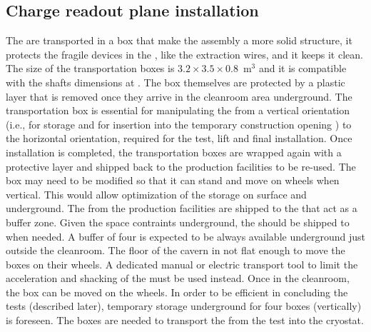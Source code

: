 \subsection{Charge readout plane installation}
The  are transported in a box that make the  assembly a more solid structure, it protects the fragile devices in the , like the extraction wires, and it keeps it clean.
The size of the transportation boxes is $3.2\times3.5\times0.8$~m$^3$ and it is compatible with the shafts dimensions at .
The box themselves are protected by a plastic layer that is removed once they arrive in the cleanroom area underground.
The transportation box is essential for manipulating the  from a vertical orientation (i.e., for storage and for insertion into the temporary construction opening ) to the horizontal orientation, required for the  \coldbox test, lift and final installation.
Once installation is completed, the transportation boxes are wrapped again with a protective layer and shipped back to the production facilities to be re-used.
The  box may need to be modified so that it can stand and move on wheels when vertical.
This would allow optimization of the storage on surface and underground.
The  from the production facilities are shipped to the  that act as a buffer zone.
Given the space contraints underground, the  should be shipped to  when needed.
A buffer of four  is expected to be always available underground just outside the cleanroom.
The floor of the cavern in not flat enough to move the  boxes on their wheels.
A dedicated manual or electric transport tool to limit the acceleration and shacking of the  must be used instead.
Once in the cleanroom, the box can be moved on the wheels.
In order to be efficient in concluding the  \coldbox tests (described later), temporary storage underground for four boxes (vertically) is foreseen.
The boxes are needed to transport the  from the \coldbox test into the cryostat.

